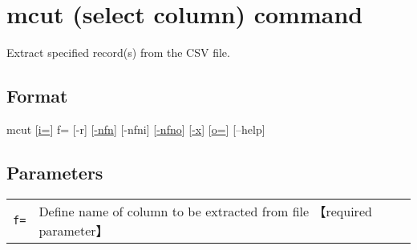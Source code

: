 \documentclass[a4paper]{jarticle}
\begin{document}
\setlength{\baselineskip}{4mm}

\section*{mcut (select column) command}
Extract specified record(s) from the CSV file. 

\subsection*{Format}
mcut [\href{run:i.pdf}{i=}] f= [-r] [\href{run:nfn.pdf}{-nfn}] [-nfni] [\href{run:nfno.pdf}{-nfno}] [\href{run:x.pdf}{-x}] [\href{run:o.pdf}{o=}] [--help]\\

\subsection*{Parameters}
\begin{table}[htbp]
{\small
\begin{tabular}{ll}
\verb|f=|    & Define name of column to be extracted from file  【required parameter】 \\
\end{tabular} 
}
\end{table} 
\end{document}
